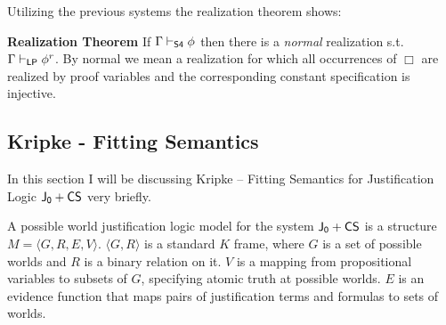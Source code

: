 \begin{mdframed}


\end{mdframed}
Utilizing the previous systems the realization theorem shows:
\begin{mdframed}
\textbf{Realization Theorem}
If $\Gamma\vdash_{\sf S4} \phi$ then there is a \emph{normal} realization s.t.  $\Gamma\vdash_{\sf LP} \phi^{r}$. By normal we mean a realization for which all occurrences of $\Box$ are realized by proof variables and the corresponding constant specification is injective.
   
\end{mdframed}
\subsection{Kripke -  Fitting Semantics}
In this section I will be discussing Kripke -- Fitting Semantics\cite{fitting2005logic} for Justification Logic $\sf{J_0} + CS$ very briefly.


  A  possible world justification logic model for the system ${\sf J_0 + CS}$  is a structure $M=\langle G, R, E, V\rangle$. $\langle G,R\rangle$ is a standard $K$ frame, where $G$ is a set of possible worlds and $R$ is a binary relation on it. $V$ is a mapping from propositional variables to subsets of $G$, specifying atomic truth at possible worlds.
$E$ is an evidence function that maps pairs of justification terms and formulas to sets of worlds.  

